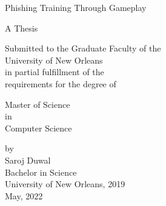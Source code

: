 \providecommand{\tabularnewline}{\\}

\begin{titlepage}
    \begin{center}\large
        Phishing Training Through Gameplay
        \vspace{5em}

        A Thesis

        \vspace{5em}

        \begin{singlespace}

            Submitted to the Graduate Faculty of the  \\
            University of New Orleans \\
            in partial fulfillment of the \\
            requirements for the degree of
        \end{singlespace}

        \vspace{5em}
        \begin{singlespace}
            Master of Science \\
            in \\
            Computer Science
        \end{singlespace}

        \vspace{5em}
        \par\end{center}
    \begin{center}\large
        \hspace{12pt} by \\
        \hspace{12pt} Saroj Duwal \\
        \hspace{12pt} Bachelor in Science \\
        \hspace{12pt} University of New Orleans, 2019 \\
        \hspace{12pt} May, 2022\\


        \par\end{center}
\end{titlepage}
\pagebreak{}
\clearpage
\setcounter{page}{2}


